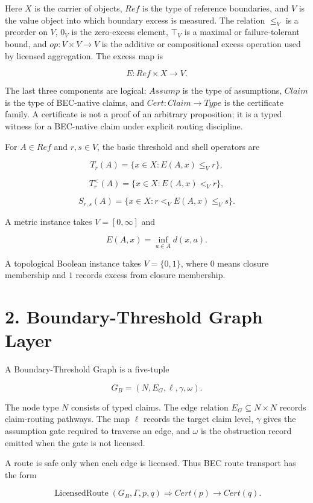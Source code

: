 \documentclass[
  11pt,
]{article}
\begin{document}
Here \(X\) is the carrier of objects, \(Ref\) is the type of reference
boundaries, and \(V\) is the value object into which boundary excess is
measured. The relation \(\le_V\) is a preorder on \(V\), \(0_V\) is the
zero-excess element, \(\top_V\) is a maximal or failure-tolerant bound,
and \(op:V\times V\to V\) is the additive or compositional excess
operation used by licensed aggregation. The excess map is

\[
E:Ref\times X\to V.
\]

The last three components are logical: \(Assump\) is the type of
assumptions, \(Claim\) is the type of BEC-native claims, and
\(Cert:Claim\to Type\) is the certificate family. A certificate is not a
proof of an arbitrary proposition; it is a typed witness for a
BEC-native claim under explicit routing discipline.

For \(A\in Ref\) and \(r,s\in V\), the basic threshold and shell
operators are

\[
T_r(A)=\{x\in X:E(A,x)\le_V r\},
\]

\[
T^{<}_r(A)=\{x\in X:E(A,x)<_V r\},
\]

\[
S_{r,s}(A)=\{x\in X:r<_V E(A,x)\le_V s\}.
\]

A metric instance takes \(V=[0,\infty]\) and

\[
E(A,x)=\inf_{a\in A}d(x,a).
\]

A topological Boolean instance takes \(V=\{0,1\}\), where \(0\) means
closure membership and \(1\) records excess from closure membership.

\section{2. Boundary-Threshold Graph
Layer}\label{boundary-threshold-graph-layer}

A Boundary-Threshold Graph is a five-tuple

\[
G_B=(N,E_G,\ell,\gamma,\omega).
\]

The node type \(N\) consists of typed claims. The edge relation
\(E_G\subseteq N\times N\) records claim-routing pathways. The map
\(\ell\) records the target claim level, \(\gamma\) gives the assumption
gate required to traverse an edge, and \(\omega\) is the obstruction
record emitted when the gate is not licensed.

A route is safe only when each edge is licensed. Thus BEC route
transport has the form

\[
\operatorname{LicensedRoute}(G_B,\Gamma,p,q)
\Rightarrow Cert(p)\to Cert(q).
\]
\end{document}
